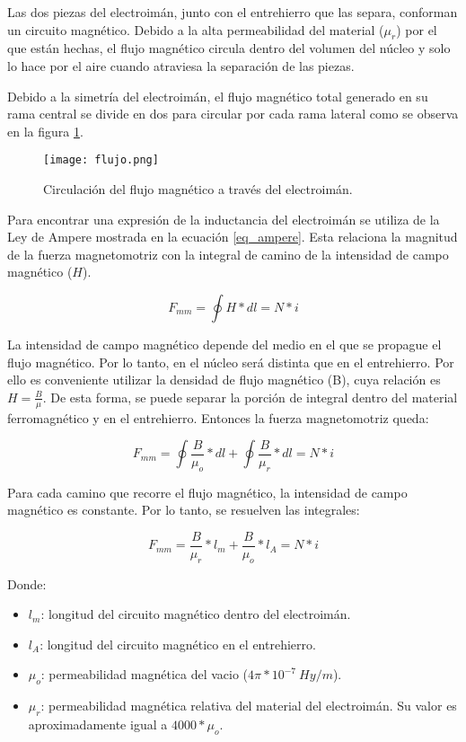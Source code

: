 \noindent Las dos piezas del electroimán, junto con el entrehierro que las separa, conforman un circuito magnético. Debido a la alta permeabilidad del material ($\mu_{r}$) por el que están hechas, el flujo magnético circula dentro del volumen del núcleo y solo lo hace por el aire cuando atraviesa la separación de las piezas.

\noindent Debido a la simetría del electroimán, el flujo magnético total generado en su rama central se divide en dos para circular por cada rama lateral como se observa en la figura \ref{fig:img_flujo}.

\begin{figure}[H]
	\centering
	\texttt{[image: flujo.png]}
	\caption{Circulación del flujo magnético a través del electroimán.}
	\label{fig:img_flujo}
\end{figure}

\noindent Para encontrar una expresión de la inductancia del electroimán se utiliza de la Ley de Ampere mostrada en la ecuación \ref{eq_ampere}. Esta relaciona la magnitud de la fuerza magnetomotriz con la integral de camino de la intensidad de campo magnético ($H$).

\begin{equation} \label{eq_ampere}
	F_{mm}=\oint{H*dl}=N*i
\end{equation}

\noindent La intensidad de campo magnético depende del medio en el que se propague el flujo magnético. Por lo tanto, en el núcleo será distinta que en el entrehierro. Por ello es conveniente utilizar la densidad de flujo magnético (B), cuya relación es $H=\frac{B}{\mu}$. De esta forma, se puede separar la porción de integral dentro del material ferromagnético y en el entrehierro. Entonces la fuerza magnetomotriz queda:

\begin{equation} 
	F_{mm}=\oint{\frac{B}{\mu_{o}}*dl}+\oint{\frac{B}{\mu_{r}}*dl}=N*i
\end{equation}

\noindent Para cada camino que recorre el flujo magnético, la intensidad de campo magnético es constante. Por lo tanto, se resuelven las integrales:

\begin{equation}\label{eq_fuerza-mm}
	F_{mm}=\frac{B}{\mu_{r}}*l_{m}+\frac{B}{\mu_{o}}*l_{A}=N*i
\end{equation}

Donde:
\begin{itemize}
	\item $l_{m}$: longitud del circuito magnético dentro del electroimán.
	\item $l_{A}$: longitud del circuito magnético en el entrehierro.
	\item $\mu_{o}$: permeabilidad magnética del vacio ($4 \pi * 10^{-7}\:Hy/m$).
	\item $\mu_{r}$: permeabilidad magnética relativa del material del electroimán. Su valor es aproximadamente igual a $4000 * \mu_{o}$.
	
\end{itemize}


